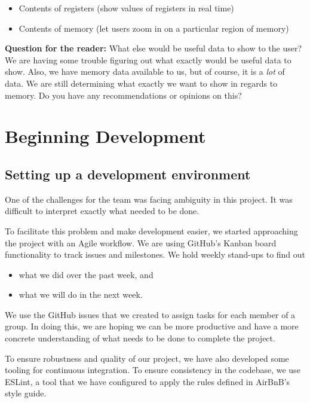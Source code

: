 \begin{itemize}
  \item Contents of registers (show values of registers in real time)
  \item Contents of memory (let users zoom in on a particular region of memory)
\end{itemize}

\textbf{Question for the reader:} What else would be useful data to show to the user?
We are having some trouble figuring out what exactly would be useful data to show.
Also, we have memory data available to us, but of course, it is a \textit{lot} of data.
We are still determining what exactly we want to show in regards to memory.
Do you have any recommendations or opinions on this?

\section{Beginning Development}

\subsection*{Setting up a development environment}

One of the challenges for the team was facing ambiguity in this project.
It was difficult to interpret exactly what needed to be done.

To facilitate this problem and make development easier,
we started approaching the project with an Agile workflow.
We are using GitHub's Kanban board functionality to track issues and milestones.
We hold weekly stand-ups to find out

\begin{itemize}
  \item what we did over the past week, and
  \item what we will do in the next week.
\end{itemize}

\noindent
We use the GitHub issues that we created to assign tasks for each member of a group.
In doing this, we are hoping we can be more productive and have a more concrete
understanding of what needs to be done to complete the project.

To ensure robustness and quality of our project,
we have also developed some tooling for continuous integration.
To ensure consistency in the codebase, we use ESLint, a tool that we have configured
to apply the rules defined in AirBnB's style guide.

